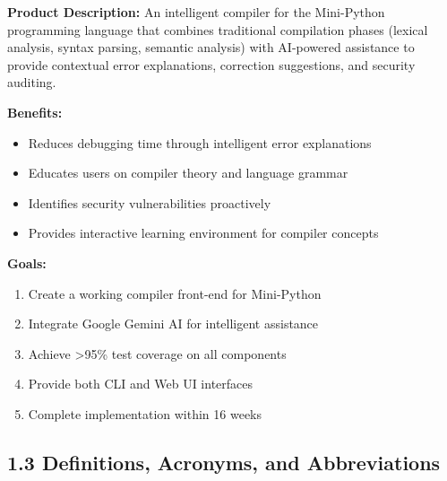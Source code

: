 \documentclass[a4paper,11pt]{article}
\begin{document}
\textbf{Product Description:} An intelligent compiler for the Mini-Python programming language that combines traditional compilation phases (lexical analysis, syntax parsing, semantic analysis) with AI-powered assistance to provide contextual error explanations, correction suggestions, and security auditing.

\textbf{Benefits:}
\begin{itemize}
    \item Reduces debugging time through intelligent error explanations
    \item Educates users on compiler theory and language grammar
    \item Identifies security vulnerabilities proactively
    \item Provides interactive learning environment for compiler concepts
\end{itemize}

\textbf{Goals:}
\begin{enumerate}
    \item Create a working compiler front-end for Mini-Python
    \item Integrate Google Gemini AI for intelligent assistance
    \item Achieve >95\% test coverage on all components
    \item Provide both CLI and Web UI interfaces
    \item Complete implementation within 16 weeks
\end{enumerate}

\subsection{1.3 Definitions, Acronyms, and Abbreviations}
\end{document}
